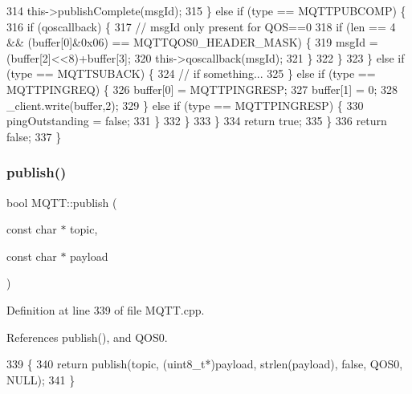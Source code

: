 \begin{DoxyCode}
314                   this->publishComplete(msgId);
315                 \} \textcolor{keywordflow}{else} \textcolor{keywordflow}{if} (type == MQTTPUBCOMP) \{
316                   \textcolor{keywordflow}{if} (qoscallback) \{
317                       \textcolor{comment}{// msgId only present for QOS==0}
318                       \textcolor{keywordflow}{if} (len == 4 && (buffer[0]&0x06) == MQTTQOS0_HEADER_MASK) \{
319                           msgId = (buffer[2]<<8)+buffer[3];
320                           this->qoscallback(msgId);
321                       \}
322                   \}
323                 \} \textcolor{keywordflow}{else} \textcolor{keywordflow}{if} (type == MQTTSUBACK) \{
324                     \textcolor{comment}{// if something...}
325                 \} \textcolor{keywordflow}{else} \textcolor{keywordflow}{if} (type == MQTTPINGREQ) \{
326                     buffer[0] = MQTTPINGRESP;
327                     buffer[1] = 0;
328                     _client.write(buffer,2);
329                 \} \textcolor{keywordflow}{else} \textcolor{keywordflow}{if} (type == MQTTPINGRESP) \{
330                     pingOutstanding = \textcolor{keyword}{false};
331                 \}
332             \}
333         \}
334         \textcolor{keywordflow}{return} \textcolor{keyword}{true};
335     \}
336     \textcolor{keywordflow}{return} \textcolor{keyword}{false};
337 \}
\end{DoxyCode}
\mbox{\label{class_m_q_t_t_a0a335a0e6c60ea0e256f76a1969a5137}} 
\subsubsection{publish()\hspace{0.1cm}{\footnotesize\ttfamily [1/10]}}
{\footnotesize\ttfamily bool M\+Q\+T\+T\+::publish (\begin{DoxyParamCaption}\item[{const char $\ast$}]{topic,  }\item[{const char $\ast$}]{payload }\end{DoxyParamCaption})}



Definition at line 339 of file M\+Q\+T\+T.\+cpp.



References publish(), and Q\+O\+S0.


\begin{DoxyCode}
339                                                          \{
340     \textcolor{keywordflow}{return} publish(topic, (uint8\_t*)payload, strlen(payload), \textcolor{keyword}{false}, QOS0, NULL);
341 \}
\end{DoxyCode}
\mbox{\label{class_m_q_t_t_a802136b5419b3a694ea88be27bdb9043}} 

